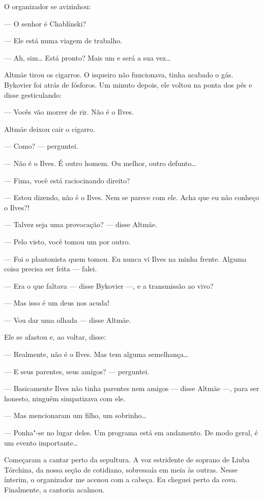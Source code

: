 O organizador se avizinhou:

--- O senhor é Chablínski?

--- Ele está numa viagem de trabalho.

--- Ah, sim\ldots{} Está pronto? Mais um e será a sua vez\ldots{}

Altmäe tirou os cigarros. O isqueiro não funcionava, tinha acabado o
gás. Bykovier foi atrás de fósforos. Um minuto depois, ele voltou na
ponta dos pés e disse gesticulando:

--- Vocês vão morrer de rir. Não é o Ilves.

Altmäe deixou cair o cigarro.

--- Como? --- perguntei.

--- Não é o Ilves. É outro homem. Ou melhor, outro defunto\ldots{}

--- Fima, você está raciocinando direito?

--- Estou dizendo, não é o Ilves. Nem se parece com ele. Acha que eu não
conheço o Ilves?!

--- Talvez seja uma provocação? --- disse Altmäe.

--- Pelo visto, você tomou um por outro.

--- Foi o plantonista quem tomou. Eu nunca vi Ilves na minha frente.
Alguma coisa precisa ser feita --- falei.

--- Era o que faltava --- disse Bykovier ---, e a transmissão ao vivo?

--- Mas isso é um deus nos acuda!

--- Vou dar uma olhada --- disse Altmäe.

Ele se afastou e, ao voltar, disse:

--- Realmente, não é o Ilves. Mas tem alguma semelhança\ldots{}

--- E seus parentes, seus amigos? --- perguntei.

--- Basicamente Ilves não tinha parentes nem amigos --- disse Altmäe
---, para ser honesto, ninguém simpatizava com ele.

--- Mas mencionaram um filho, um sobrinho\ldots{}

--- Ponha"-se no lugar deles. Um programa está em andamento. De modo
geral, é um evento importante\ldots{}

Começaram a cantar perto da sepultura. A voz estridente de soprano de
Liuba Tórchina, da nossa seção de cotidiano, sobressaía em meia às
outras. Nesse ínterim, o organizador me acenou com a cabeça. Eu cheguei
perto da cova. Finalmente, a cantoria acalmou.

